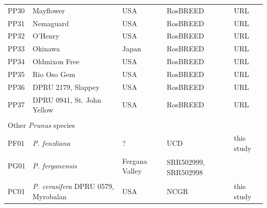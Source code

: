 \documentclass[12pt]{article}
\begin{document}
\begin{center}
\begin{longtable}{lllll}
                 PP30 &Mayflower&USA &RosBREED &URL \\
                 PP31 &Nemaguard &USA &RosBREED &URL \\
                 PP32 &O'Henry &USA &RosBREED &URL \\
                 PP33 &Okinawa &Japan &RosBREED &URL \\
                 PP34 &Oldmixon Free &USA &RosBREED &URL \\
                 PP35 &Rio Oso Gem &USA &RosBREED &URL \\
                 PP36 &DPRU 2179, Slappey &USA &RosBREED &URL \\
                 PP37 &DPRU 0941, St. John Yellow &USA &RosBREED &URL \\
		\\
                 \multicolumn{5}{l}{Other \emph{Prunus} species}  \\
                 PF01 &\emph{P. fenzliana} &? &UCD &this study\\
                 PG01 &\emph{P. ferganensis} &Fergana Valley &
		\multirow{2}{1cm}{SRR502999, SRR502998} &\citealt{verde2013high}\\
                 \\
                 PC01 &\emph{P. cerasifera} DPRU 0579, Myrobalan &USA &NCGR &this study\\ \hline

\end{longtable}
\end{center}
\endsupplement
\end{document}
